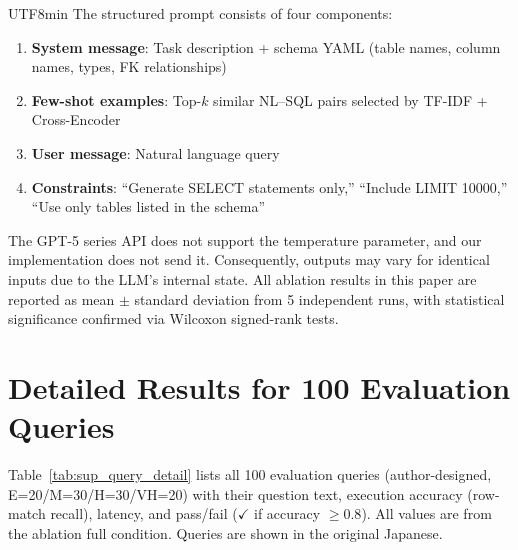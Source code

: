 \documentclass[sn-mathphys,Numbered]{sn-jnl}
\begin{document}
\begin{CJK}{UTF8}{min}
The structured prompt consists of four components:

\begin{enumerate}
  \item \textbf{System message}: Task description + schema YAML
    (table names, column names, types, FK relationships)
  \item \textbf{Few-shot examples}: Top-$k$ similar NL--SQL pairs
    selected by TF-IDF + Cross-Encoder
  \item \textbf{User message}: Natural language query
  \item \textbf{Constraints}: ``Generate SELECT statements only,''
    ``Include LIMIT 10000,''
    ``Use only tables listed in the schema''
\end{enumerate}

The GPT-5 series API does not support the temperature parameter,
and our implementation does not send it.
Consequently, outputs may vary for identical inputs due to the
LLM's internal state.
All ablation results in this paper are reported as mean $\pm$
standard deviation from 5 independent runs, with statistical
significance confirmed via Wilcoxon signed-rank tests.

\section{Detailed Results for 100 Evaluation Queries}
\label{sec:sup_query_detail}

Table~\ref{tab:sup_query_detail} lists all 100 evaluation queries
(author-designed, E=20/M=30/H=30/VH=20) with their question text,
execution accuracy (row-match recall), latency, and
pass/fail ($\checkmark$ if accuracy $\geq 0.8$).
All values are from the ablation full condition. Queries are shown
in the original Japanese.


\end{CJK}
\end{document}
